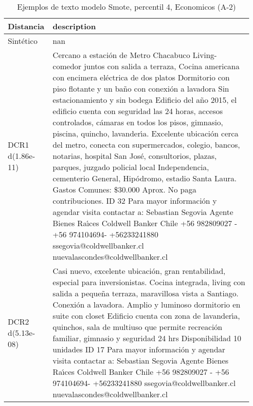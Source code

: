 \begin{table}[H]
\centering
\fontsize{10}{14}\selectfont
\caption{Ejemplos de texto modelo Smote, percentil 4, Economicos (A-2)}
\label{table-example-economicos-a-2-smote-enc-4p-text}
\begin{tabular}{|l|m{35em}|}
\hline
\rowcolor[gray]{0.8}
Distancia & description \\
\hline Sintético & nan \\
\hline DCR1 d(1.86e-11) & Cercano a estaci\'on de Metro Chacabuco
Living-comedor juntos con salida a terraza, Cocina americana con encimera el\'ectrica de dos platos  
Dormitorio con piso flotante y un ba\~no con conexi\'on a lavadora 
Sin estacionamiento y sin bodega
Edificio del a\~no 2015, el edificio cuenta con seguridad las 24 horas, accesos controlados, c\'amaras en todos los pisos, gimnasio, piscina, quincho, lavander{\'\i}a. 
Excelente ubicaci\'on cerca del metro, conecta con supermercados, colegio, bancos, notarias, hospital San Jos\'e, consultorios, plazas, parques, juzgado policial local Independencia, cementerio General, Hip\'odromo, estadio Santa Laura.
Gastos Comunes: \$30.000 Aprox.
No paga contribuciones.
ID 32
Para mayor informaci\'on y agendar visita contactar a:
Sebastian Segovia
Agente Bienes Ra{\'\i}ces
Coldwell Banker Chile
+56 982809027 - +56 974104694- +56233241880 
ssegovia@coldwellbanker.cl
nuevalascondes@coldwellbanker.cl \\
\hline DCR2 d(5.13e-08) & Casi nuevo, excelente ubicaci\'on, gran rentabilidad, especial para inversionistas.
Cocina integrada, living con salida a peque\~na terraza, maravillosa vista a Santiago.
Conexi\'on a lavadora.
Amplio y luminoso dormitorio en suite con closet
Edificio cuenta con zona de lavander{\'\i}a, quinchos, sala de multiuso que permite recreaci\'on familiar, gimnasio y seguridad 24 hrs
Disponibilidad 10 unidades
ID 17
Para mayor informaci\'on y agendar visita contactar a:
Sebastian Segovia
Agente Bienes Ra{\'\i}ces
Coldwell Banker Chile
+56 982809027 - +56 974104694- +56233241880 
ssegovia@coldwellbanker.cl
nuevalascondes@coldwellbanker.cl \\
\hline
\end{tabular}
\end{table}
